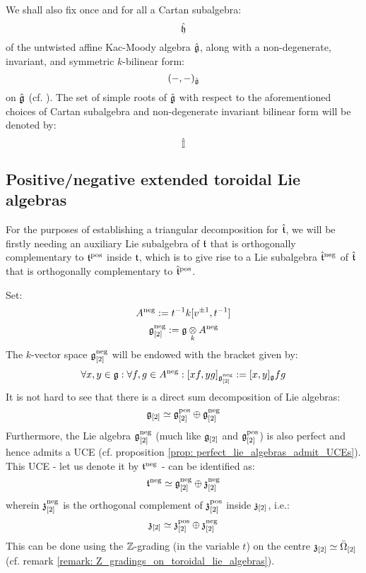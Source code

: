     \begin{convention} \label{conv: a_fixed_untwisted_affine_kac_moody_algebra}
        We shall also fix once and for all a Cartan subalgebra:
            $$\hat{\mathfrak{h}}$$
        of the untwisted affine Kac-Moody algebra $\hat{\mathfrak{g}}$, along with a non-degenerate, invariant, and symmetric $k$-bilinear form:
            $$(-, -)_{\hat{\mathfrak{g}}}$$
        on $\hat{\mathfrak{g}}$ (cf. \cite[Chapter 2]{kac_infinite_dimensional_lie_algebras}). The set of simple roots of $\hat{\mathfrak{g}}$ with respect to the aforementioned choices of Cartan subalgebra and non-degenerate invariant bilinear form will be denoted by:
            $$\hat{\mathbb{I}}$$
    \end{convention}

    \subsection{Positive/negative extended toroidal Lie algebras}
        For the purposes of establishing a triangular decomposition for $\hat{\mathfrak{t}}$, we will be firstly needing an auxiliary Lie subalgebra of $\mathfrak{t}$ that is orthogonally complementary to $\mathfrak{t}^{\mathrm{pos}}$ inside $\mathfrak{t}$, which is to give rise to a Lie subalgebra $\hat{\mathfrak{t}}^{\mathrm{neg}}$ of $\hat{\mathfrak{t}}$ that is orthogonally complementary to $\hat{\mathfrak{t}}^{\mathrm{pos}}$.

        Set:
            $$A^{\mathrm{neg}} := t^{-1} k[v^{\pm 1}, t^{-1}]$$
            $$\g_{[2]}^{\negative} := \g \tensor_k A^{\negative}$$
        The $k$-vector space $\mathfrak{g}_{[2]}^{\mathrm{neg}}$ will be endowed with the bracket given by:
            $$\forall x, y \in \mathfrak{g}: \forall f, g \in A^{\mathrm{neg}}: [x f, y g]_{\mathfrak{g}_{[2]}^{\mathrm{neg}}} := [x, y]_{\mathfrak{g}} fg$$
        It is not hard to see that there is a direct sum decomposition of Lie algebras:
            $$\mathfrak{g}_{[2]} \simeq \mathfrak{g}_{[2]}^{\mathrm{pos}} \oplus \mathfrak{g}_{[2]}^{\mathrm{neg}}$$
        Furthermore, the Lie algebra $\mathfrak{g}_{[2]}^{\mathrm{neg}}$ (much like $\mathfrak{g}_{[2]}$ and $\mathfrak{g}_{[2]}^{\mathrm{pos}}$) is also perfect and hence admits a UCE (cf. proposition \ref{prop: perfect_lie_algebras_admit_UCEs}). This UCE - let us denote it by $\mathfrak{t}^{\mathrm{neg}}$ - can be identified as:
            $$\mathfrak{t}^{\mathrm{neg}} \simeq \mathfrak{g}_{[2]}^{\mathrm{neg}} \oplus \mathfrak{z}_{[2]}^{\mathrm{neg}}$$
        wherein $\mathfrak{z}_{[2]}^{\mathrm{neg}}$ is the orthogonal complement of $\mathfrak{z}_{[2]}^{\mathrm{pos}}$ inside $\mathfrak{z}_{[2]}$, i.e.:
            $$\mathfrak{z}_{[2]} \simeq \mathfrak{z}_{[2]}^{\mathrm{pos}} \oplus \mathfrak{z}_{[2]}^{\mathrm{neg}}$$
        This can be done using the $\mathbb{Z}$-grading (in the variable $t$) on the centre $\mathfrak{z}_{[2]} \simeq \bar{\Omega}_{[2]}$ (cf. remark \ref{remark: Z_gradings_on_toroidal_lie_algebras}).
        

